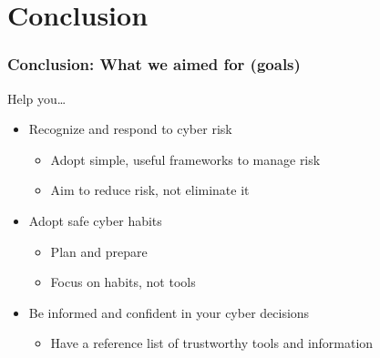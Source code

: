 \documentclass[blue]{beamer}
\begin{document}
\section{Conclusion}



\begin{frame}
\frametitle{Conclusion: What we aimed for (goals)}

Help you\ldots{}

\begin{itemize}
  \item Recognize and respond to cyber risk
  \begin{itemize}
    \item Adopt simple, useful frameworks to manage risk
    \item Aim to reduce risk, not eliminate it
  \end{itemize}
  \item Adopt safe cyber habits
  \begin{itemize}
    \item Plan and prepare
    \item Focus on habits, not tools
  \end{itemize}
  \item Be informed and confident in your cyber decisions
  \begin{itemize}
    \item Have a reference list of trustworthy tools and information
  \end{itemize}
\end{itemize}

\end{frame}
\end{document}
